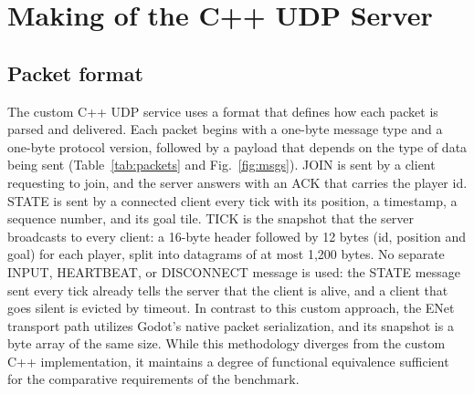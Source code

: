 \IfFileExists{IEEEtran.cls}{\ieeetrue\documentclass[conference]{IEEEtran}}{\ieeefalse\documentclass[twocolumn,10pt]{article}}
\begin{document}
\section{Making of the C++ UDP Server}
\subsection{Packet format}
The custom C++ UDP service uses a format that defines how each packet is parsed and delivered. Each packet begins with a one-byte message type and a one-byte protocol version, followed by a payload that depends on the type of data being sent (Table~\ref{tab:packets} and Fig.~\ref{fig:msgs}). JOIN is sent by a client requesting to join, and the server answers with an ACK that carries the player id. STATE is sent by a connected client every tick with its position, a timestamp, a sequence number, and its goal tile. TICK is the snapshot that the server broadcasts to every client: a 16-byte header followed by 12 bytes (id, position and goal) for each player, split into datagrams of at most 1,200 bytes. No separate INPUT, HEARTBEAT, or DISCONNECT message is used: the STATE message sent every tick already tells the server that the client is alive, and a client that goes silent is evicted by timeout. In contrast to this custom approach, the ENet transport path utilizes Godot's native packet serialization, and its snapshot is a byte array of the same size. While this methodology diverges from the custom C++ implementation, it maintains a degree of functional equivalence sufficient for the comparative requirements of the benchmark.
\end{document}
